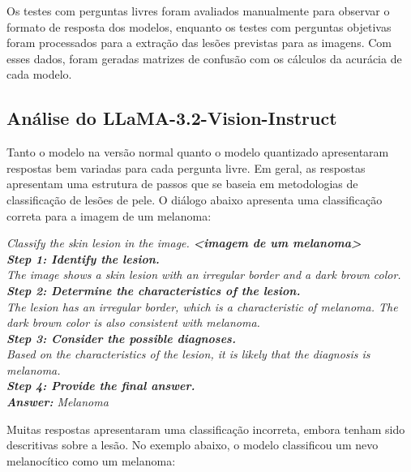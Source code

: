 Os testes com perguntas livres foram avaliados manualmente para observar o formato de resposta dos modelos, enquanto os testes com perguntas objetivas foram processados
para a extração das lesões previstas para as imagens. Com esses dados, foram geradas matrizes de confusão com os cálculos da acurácia de cada modelo.

\subsection{Análise do LLaMA-3.2-Vision-Instruct}

Tanto o modelo na versão normal quanto o modelo quantizado apresentaram respostas bem variadas para cada pergunta livre. Em geral, as respostas apresentam uma estrutura
de passos que se baseia em metodologias de classificação de lesões de pele. O diálogo abaixo apresenta uma classificação correta para a imagem de um melanoma:

\begin{dialogue}
     \textit{Classify the skin lesion in the image. \textbf{<imagem de um melanoma>}} \\
     \textit{\textbf{Step 1: Identify the lesion.} \\
        The image shows a skin lesion with an irregular border and a dark brown color. \\
        \textbf{Step 2: Determine the characteristics of the lesion.} \\
        The lesion has an irregular border, which is a characteristic of melanoma. The dark brown color is also consistent with melanoma. \\
        \textbf{Step 3: Consider the possible diagnoses.} \\
        Based on the characteristics of the lesion, it is likely that the diagnosis is melanoma. \\
        \textbf{Step 4: Provide the final answer.} \\
        \textbf{Answer:} Melanoma}
\end{dialogue}

Muitas respostas apresentaram uma classificação incorreta, embora tenham sido descritivas sobre a lesão. No exemplo abaixo, o modelo classificou um nevo melanocítico
como um melanoma:

